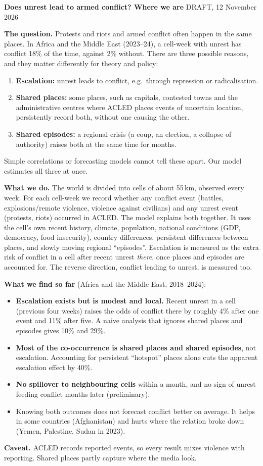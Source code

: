 \documentclass[10.5pt]{article}
\begin{document}
\textbf{Does unrest lead to armed conflict? Where we are} \hfill \small DRAFT, 12 November 2026\normalsize

\textbf{The question.} Protests and riots and armed conflict often happen in the same places. In
Africa and the Middle East (2023--24), a cell-week with unrest has conflict 18\% of the time,
against 2\% without. There are three possible reasons, and they matter differently for theory and
policy:
\begin{enumerate}
\item \textbf{Escalation:} unrest leads to conflict, e.g.\ through repression or radicalisation.
\item \textbf{Shared places:} some places, such as capitals, contested towns and the administrative
centres where ACLED places events of uncertain location, persistently record both, without one
causing the other.
\item \textbf{Shared episodes:} a regional crisis (a coup, an election, a collapse of authority)
raises both at the same time for months.
\end{enumerate}
Simple correlations or forecasting models cannot tell these apart. Our model estimates all three
at once.

\textbf{What we do.} The world is divided into cells of about 55\,km, observed every week. For each
cell-week we record whether any conflict event (battles, explosions/remote violence, violence
against civilians) and any unrest event (protests, riots) occurred in ACLED. The model explains
both together. It uses the cell's own recent history, climate, population, national conditions
(GDP, democracy, food insecurity), country differences, persistent differences between places, and
slowly moving regional ``episodes''. Escalation is measured as the extra risk of conflict in a cell
after recent unrest \emph{there}, once places and episodes are accounted for. The reverse
direction, conflict leading to unrest, is measured too.

\textbf{What we find so far} (Africa and the Middle East, 2018--2024):
\begin{itemize}
\item \textbf{Escalation exists but is modest and local.} Recent unrest in a cell (previous four weeks)
raises the odds of conflict there by roughly 4\% after one event and 11\% after five. A naive
analysis that ignores shared places and episodes gives 10\% and 29\%.
\item \textbf{Most of the co-occurrence is shared places and shared episodes}, not escalation.
Accounting for persistent ``hotspot'' places alone cuts the apparent escalation effect by 40\%.
\item \textbf{No spillover to neighbouring cells} within a month, and no sign of unrest feeding conflict
months later (preliminary).
\item Knowing both outcomes does not forecast conflict better on average. It helps in some
countries (Afghanistan) and hurts where the relation broke down (Yemen, Palestine, Sudan in 2023).
\end{itemize}
\textbf{Caveat.} ACLED records reported events, so every result mixes violence with reporting. Shared
places partly capture where the media look.
\end{document}
